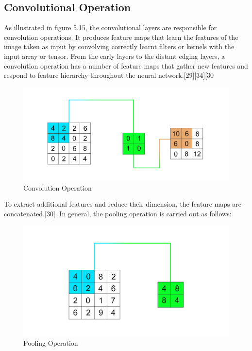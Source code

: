 \documentclass[conference]{IEEEtran}
\begin{document}
\subsection{Convolutional Operation}
As illustrated in figure 5.15, the convolutional layers are responsible for convolution operations. It produces feature maps that learn the features of the image taken as input by convolving correctly learnt filters or kernels with the input array or tensor. From the early layers to the distant edging layers, a convolution operation has a number of feature maps that gather new features and respond to feature hierarchy throughout the neural network.[29][34][30

\begin{figure}[hbt!]
\centerline{\includegraphics[scale=0.4]{feature map.png}}
\caption{Convolution Operation}
\label{fig}
\end{figure}

\noindent To extract additional features and reduce their dimension, the feature maps are concatenated.[30]. In general, the pooling operation is carried out as follows:

\begin{figure}[hbt!]
\centerline{\includegraphics[scale=0.4]{pooling.png}}
\caption{Pooling Operation}
\label{fig}
\end{figure}
\end{document}
